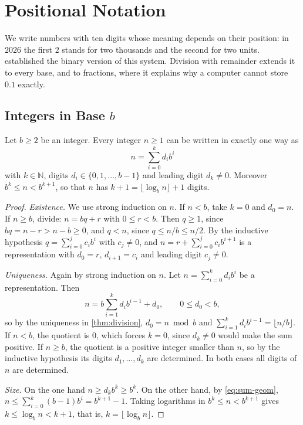 \section{Positional Notation}
\label{sec:positional}

We write numbers with ten digits whose meaning depends on their position: in $2026$ the first $2$ stands for two thousands and the second for two units.  established the binary version of this system. Division with remainder extends it to every base, and to fractions, where it explains why a computer cannot store $0.1$ exactly.

\subsection{Integers in Base $b$}

\begin{theorem}
\label{thm:base}
Let $b\ge2$ be an integer. Every integer $n\ge1$ can be written in exactly one way as
\[
n=\sum_{i=0}^{k}d_ib^i
\]
with $k\in\mathbb N$, digits $d_i\in\{0,1,\ldots,b-1\}$ and leading digit $d_k\ne0$. Moreover $b^k\le n<b^{k+1}$, so that $n$ has $k+1=\lfloor\log_bn\rfloor+1$ digits.
\end{theorem}

\begin{proof}
\emph{Existence.} We use strong induction on $n$. If $n<b$, take $k=0$ and $d_0=n$. If $n\ge b$, divide: $n=bq+r$ with $0\le r<b$. Then $q\ge1$, since $bq=n-r>n-b\ge0$, and $q<n$, since $q\le n/b\le n/2$. By the inductive hypothesis $q=\sum_{i=0}^{j}c_ib^i$ with $c_j\ne0$, and $n=r+\sum_{i=0}^{j}c_ib^{i+1}$ is a representation with $d_0=r$, $d_{i+1}=c_i$ and leading digit $c_j\ne0$.

\emph{Uniqueness.} Again by strong induction on $n$. Let $n=\sum_{i=0}^{k}d_ib^i$ be a representation. Then
\[
n=b\sum_{i=1}^{k}d_ib^{i-1}+d_0,\qquad0\le d_0<b,
\]
so by the uniqueness in \cref{thm:division}, $d_0=n\bmod b$ and $\sum_{i=1}^kd_ib^{i-1}=\lfloor n/b\rfloor$. If $n<b$, the quotient is $0$, which forces $k=0$, since $d_k\ne0$ would make the sum positive. If $n\ge b$, the quotient is a positive integer smaller than $n$, so by the inductive hypothesis its digits $d_1,\ldots,d_k$ are determined. In both cases all digits of $n$ are determined.

\emph{Size.} On the one hand $n\ge d_kb^k\ge b^k$. On the other hand, by \eqref{eq:sum-geom}, $n\le\sum_{i=0}^k(b-1)b^i=b^{k+1}-1$. Taking logarithms in $b^k\le n<b^{k+1}$ gives $k\le\log_bn<k+1$, that is, $k=\lfloor\log_bn\rfloor$.
\end{proof}

